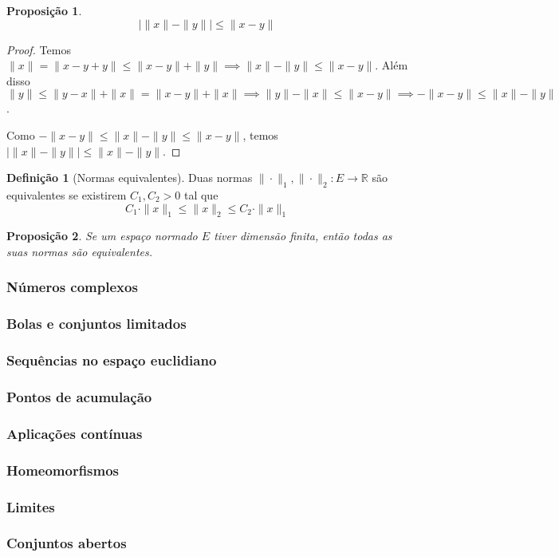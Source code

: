 \documentclass{article}
\theoremstyle{plain}
\newtheorem{prop}{Proposição}[section]
\theoremstyle{definition}
\newtheorem{definicao}{Definição}[section]
\theoremstyle{remark}
\begin{document}
\begin{prop}
	$$| \| x \| - \| y \| |  \leq  \|  x - y \| $$
\end{prop}
\begin{proof}
	Temos $\| x\| = \| x-y +y\| \leq \|x-y\| +\|y\| \implies \| x\| - \|y\| \leq \| x-y\|$. Além disso $\|y\| \leq \|y-x\| + \|x\| = \|x-y\| +\|x\| \implies \|y\| -\|x\| \leq \| x-y\| \implies -\|x-y\| \leq \|x\| - \|y\|$.

	Como $-\|x-y\| \leq \|x\| - \|y\| \leq \|x-y\|$, temos $| \|x\| - \|y\| | \leq \|x\| -\|y\|$.

\end{proof}
\begin{definicao}[Normas equivalentes]
	Duas normas $\|\cdot \|_1, \| \cdot \|_2 : E \to \mathbb{R}$ são equivalentes se existirem $C_1,C_2 > 0$ tal que $$ C_1 \cdot \|x\|_1 \leq \|x\|_2 \leq C_2\cdot \| x\|_1 $$
\end{definicao}
\begin{prop}
	Se um espaço normado $E$ tiver dimensão finita, então todas as suas normas são equivalentes.
\end{prop}
   \subsubsection{Números complexos}
   \subsubsection{Bolas e conjuntos limitados}
   \subsubsection{Sequências no espaço euclidiano}
   \subsubsection{Pontos de acumulação}
   \subsubsection{Aplicações contínuas}
   \subsubsection{Homeomorfismos}
   \subsubsection{Limites}
   \subsubsection{ Conjuntos abertos}
\end{document}
